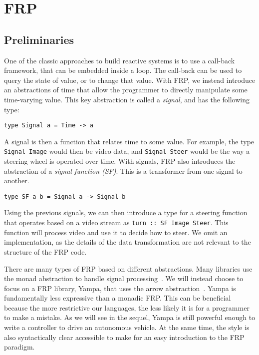 \section{FRP}

\subsection{Preliminaries}

One of the classic approaches to build reactive systems is to use a call-back framework, that can be embedded inside a loop.
The call-back can be used to query the state of value, or to change that value.
With FRP, we instead introduce an abstractions of time that allow the programmer to directly manipulate some time-varying value.
This key abstraction is called a \textit{signal}, and has the following type:

\begin{lstlisting}
type Signal a = Time -> a
\end{lstlisting}

A signal is then a function that relates time to some value.
For example, the type \texttt{Signal Image} would then be video data, and \texttt{Signal Steer} would be the way a steering wheel is operated over time.
With signals, FRP also introduces the abstraction of a \textit{signal function (SF)}.
This is a transformer from one signal to another.

\begin{lstlisting}
type SF a b = Signal a -> Signal b
\end{lstlisting}

Using the previous signals, we can then introduce a type for a steering function that operates based on a video stream as \texttt{turn :: SF Image Steer}.
This function will process video and use it to decide how to steer.
We omit an implementation, as the details of the data transformation are not relevant to the structure of the FRP code.

There are many types of FRP based on different abstractions.
Many libraries use the monad abstraction to handle signal processing~\cite{monadFRP1,monadFRP2}.
We will instead choose to focus on a FRP library, Yampa, that uses the arrow abstraction~\cite{hudak2003arrows}.
Yampa is fundamentally less expressive than a monadic FRP.
This can be beneficial because the more restrictive our languages, the less likely it is for a programmer to make a mistake.
As we will see in the sequel, Yampa is still powerful enough to write a controller to drive an autonomous vehicle.
At the same time, the style is also syntactically clear accessible to make for an easy introduction to the FRP paradigm.

